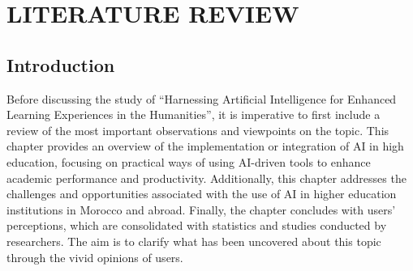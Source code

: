 \chapter{LITERATURE REVIEW}\label{ch:literature-review}
\section{Introduction}\label{sec:introduction}
\justifying
Before discussing the study of ``Harnessing Artificial Intelligence for Enhanced
Learning Experiences in the Humanities'', it is imperative to first include a review of the most
important observations and viewpoints on the topic.
This chapter provides an overview of
the implementation or integration of AI in high education, focusing on practical ways of using AI-driven tools
to enhance academic performance and productivity.
Additionally,
this chapter addresses the challenges and opportunities associated with the use of AI in higher education
institutions in Morocco and abroad.
Finally, the chapter concludes with users' perceptions, which are consolidated with
statistics and studies conducted by researchers.
The aim is to clarify
what has been uncovered about this topic through the vivid opinions of users.

